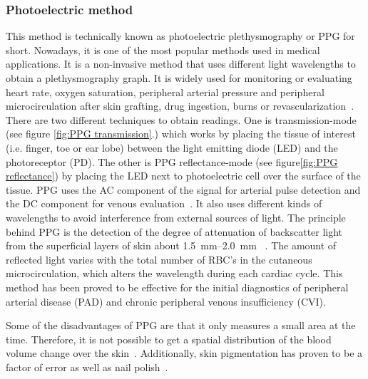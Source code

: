 \subsubsection{Photoelectric method}
\label{section literature PPG}
This method is technically known as photoelectric plethysmography or PPG for short. Nowadays, it is one of the most popular methods used in medical applications. It is a non-invasive method that uses different light wavelengths to obtain a plethysmography graph. It is widely used for monitoring or evaluating heart rate, oxygen saturation, peripheral arterial pressure and peripheral microcirculation after skin grafting, drug ingestion, burns or revascularization~\cite{holohan1996plethysmography}. There are two different techniques to obtain readings. One is transmission-mode (see figure \ref{fig:PPG transmission}.) which works by placing the tissue of interest (i.e. finger, toe or ear lobe) between the light emitting diode (LED) and the photoreceptor (PD).  The other is PPG reflectance-mode (see figure\ref{fig:PPG reflectance}) by placing the LED next to photoelectric cell over the surface of the tissue. PPG uses the AC component of the signal for arterial pulse detection and the DC component for venous evaluation~\cite{higgins1986photoplethysmographic}. It also uses different kinds of wavelengths to avoid interference from external sources of light. The principle behind PPG is the detection of the degree of attenuation of backscatter light from the superficial layers of skin about \SIrange{1.5}{2.0}{\milli\meter} ~\cite{holohan1996plethysmography,kim1986pulse,bashkatov2005optical}. The amount of reflected light varies with the total number of RBC’s in the cutaneous microcirculation, which alters the wavelength during each cardiac cycle. This method has been proved to be effective for the initial diagnostics of peripheral arterial disease (PAD) and chronic peripheral venous insufficiency (CVI).

Some of the disadvantages of PPG are that it only measures a small area at the time. Therefore, it is not possible to get a spatial distribution of the blood volume change over the skin~\cite{wu2003ppgi}. Additionally, skin pigmentation has proven to be a factor of error as well as nail polish~\cite{fallow2013influence}. 


